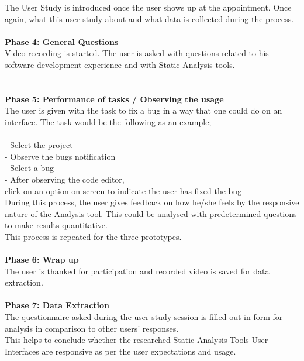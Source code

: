 The User Study is introduced once the user shows up at the appointment. Once again, what this user study about and what data is collected during the process. \\\\

\textbf{Phase 4: General Questions} \\

Video recording is started. The user is asked with questions related to his software development experience and with Static Analysis tools.  \\\\\\

\textbf{Phase 5: Performance of tasks / Observing the usage} \\

The user is given with the task to fix a bug in a way that one could do on an interface. The task would be the following as an example; \\\\
-	Select the project \\
-	Observe the bugs notification \\
-	Select a bug \\
-	After observing the code editor, \\
click on an option on screen to indicate the user has fixed the bug \\

During this process, the user gives feedback on how he/she feels by the responsive nature of the Analysis tool. This could be analysed with predetermined questions to make results quantitative. \\

This process is repeated for the three prototypes.\\\\

\textbf{Phase 6: Wrap up} \\

The user is thanked for participation and recorded video is saved for data extraction.\\\\

\textbf{Phase 7: Data Extraction} \\

The questionnaire asked during the user study session is filled out in form for analysis in comparison to other users’ responses.\\

This helps to conclude whether the researched Static Analysis Tools User Interfaces are responsive as per the user expectations and usage.\\

\let\cleardoublepage\clearpage